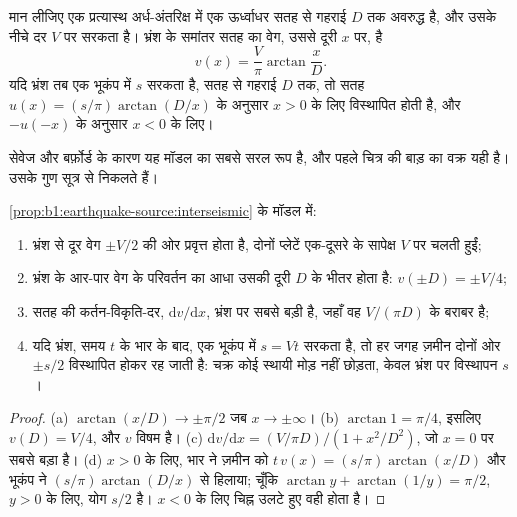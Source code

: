 \begin{proposition}[एक सरकते भ्रंश के आर-पार अंतर-भूकंपीय वेग]
\label{prop:b1:earthquake-source:interseismic}
मान लीजिए एक प्रत्यास्थ अर्ध-अंतरिक्ष में एक ऊर्ध्वाधर  सतह से गहराई $D$ तक अवरुद्ध है, और उसके नीचे दर $V$ पर सरकता है। भ्रंश के समांतर सतह का वेग, उससे दूरी $x$ पर, है
\[
  v(x) = \frac{V}{\pi}\arctan\frac{x}{D} .
\]
यदि भ्रंश तब एक भूकंप में $s$ सरकता है, सतह से गहराई $D$ तक, तो सतह $u(x) = (s/\pi)\arctan(D/x)$ के अनुसार $x > 0$ के लिए विस्थापित होती है, और $-u(-x)$ के अनुसार $x < 0$ के लिए।
\end{proposition}
\admitted

सेवेज और बर्फ़ोर्ड के कारण यह मॉडल  का सबसे सरल रूप है, और पहले चित्र की बाड़ का वक्र यही है। उसके गुण सूत्र से निकलते हैं।

\begin{proposition}[अंतर-भूकंपीय परिच्छेद को पढ़ना]
\label{prop:b1:earthquake-source:profile}
\cref{prop:b1:earthquake-source:interseismic} के मॉडल में:
\begin{enumerate}[label=(\alph*)]
  \item भ्रंश से दूर वेग $\pm V/2$ की ओर प्रवृत्त होता है, दोनों प्लेटें एक-दूसरे के सापेक्ष $V$ पर चलती हुईं;
  \item भ्रंश के आर-पार वेग के परिवर्तन का आधा उसकी दूरी $D$ के भीतर होता है: $v(\pm D) = \pm V/4$;
  \item सतह की कर्तन-विकृति-दर, $\mathrm dv/\mathrm dx$, भ्रंश पर सबसे बड़ी है, जहाँ वह $V/(\pi D)$ के बराबर है;
  \item यदि भ्रंश, समय $t$ के भार के बाद, एक भूकंप में $s = Vt$ सरकता है, तो हर जगह ज़मीन दोनों ओर $\pm s/2$ विस्थापित होकर रह जाती है: चक्र कोई स्थायी मोड़ नहीं छोड़ता, केवल भ्रंश पर विस्थापन $s$।
\end{enumerate}
\end{proposition}

\begin{proof}
(a) $\arctan(x/D) \to \pm\pi/2$ जब $x \to \pm\infty$। (b) $\arctan 1 = \pi/4$, इसलिए $v(D) = V/4$, और $v$ विषम है। (c) $\mathrm dv/\mathrm dx = (V/\pi D)/(1 +
x^2/D^2)$, जो $x = 0$ पर सबसे बड़ा है। (d) $x > 0$ के लिए, भार ने ज़मीन को $t\,v(x) = (s/\pi)\arctan(x/D)$ और भूकंप ने $(s/\pi)\arctan(D/x)$ से हिलाया; चूँकि $\arctan y + \arctan(1/y) = \pi/2$, $y > 0$ के लिए, योग $s/2$ है। $x < 0$ के लिए चिह्न उलटे हुए वही होता है।
\end{proof}

